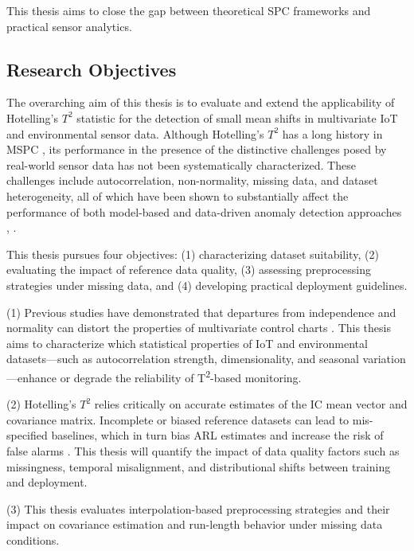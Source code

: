 This thesis aims to close the gap between theoretical SPC frameworks and practical sensor analytics.



\subsection{Research Objectives}

The overarching aim of this thesis is to evaluate and extend the applicability of Hotelling’s $T^2$ statistic for the detection of small mean shifts in multivariate \ac{IoT} and environmental sensor data. Although Hotelling’s $T^2$ has a long history in \ac{MSPC} \cite{Sauter1992} \cite{Kourti2005}, its performance in the presence of the distinctive challenges posed by real-world sensor data has not been systematically characterized. These challenges include autocorrelation, non-normality, missing data, and dataset heterogeneity, all of which have been shown to substantially affect the performance of both model-based and data-driven anomaly detection approaches \cite{Chandola2009}, \cite{Belay2023}.

This thesis pursues four objectives: (1) characterizing dataset suitability, (2) evaluating the impact of reference data quality, (3) assessing preprocessing strategies under missing data, and (4) developing practical deployment guidelines.


(1) Previous studies have demonstrated that departures from independence and normality can distort the properties of multivariate control charts \cite{Venkatasubramanian2003} \cite{Wilks2011}. This thesis aims to characterize which statistical properties of \ac{IoT} and environmental datasets—such as autocorrelation strength, dimensionality, and seasonal variation—enhance or degrade the reliability of T\textsuperscript{2}-based monitoring.

(2) Hotelling’s $T^2$ relies critically on accurate estimates of the \ac{IC} mean vector and covariance matrix. Incomplete or biased reference datasets can lead to mis-specified baselines, which in turn bias \ac{ARL} estimates and increase the risk of false alarms \cite{Yoon2019}. This thesis will quantify the impact of data quality factors such as missingness, temporal misalignment, and distributional shifts between training and deployment.

(3) This thesis evaluates interpolation-based preprocessing strategies and their impact on covariance estimation and run-length behavior under missing data conditions.

